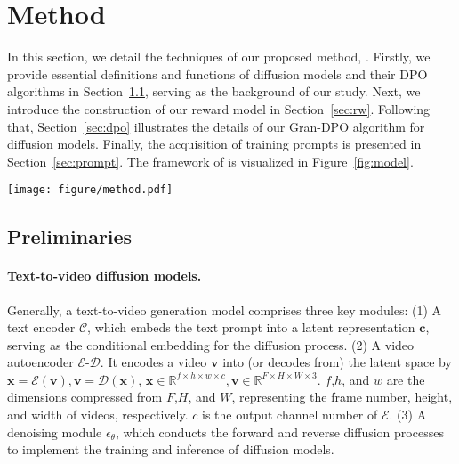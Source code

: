 \section{\ours{} Method}\label{sec:method}

In this section, we detail the techniques of our proposed method, \ours{}. 
Firstly, we provide essential definitions and functions of diffusion models and their DPO algorithms in Section~\ref{sec:preliminary}, serving as the background of our study.
Next, we introduce the construction of our reward model in Section~\ref{sec:rw}. 
Following that, Section~\ref{sec:dpo} illustrates the details of our Gran-DPO algorithm for diffusion models. Finally, the acquisition of training prompts is presented in Section~\ref{sec:prompt}. The framework of \ours{} is visualized in Figure~\ref{fig:model}.

\begin{figure*}[ht]
    \centering
    \texttt{[image: figure/method.pdf]}
    \caption{The framework of our proposed method, \ours{}.
    }
    \label{fig:model}
\end{figure*}

\subsection{Preliminaries}\label{sec:preliminary}

\paragraph{Text-to-video diffusion models.}
Generally, a text-to-video generation model comprises three key modules: (1) A text encoder $\mathcal{C}$, which embeds the text prompt into a latent representation $\mathbf{c}$, serving as the conditional embedding for the diffusion process. (2) A video autoencoder $\mathcal{E}$-$\mathcal{D}$. It encodes a video $\mathbf{v}$ into (or decodes from) the latent space by 
$\mathbf{x}=\mathcal{E}(\mathbf{v}), \mathbf{v}=\mathcal{D}(\mathbf{x})$, $\mathbf{x}\in\mathbb{R}^{f\times h\times w\times c},\mathbf{v}\in\mathbb{R}^{F\times H\times W\times 3}$. $f$,$h$, and $w$ are the dimensions compressed from $F$,$H$, and $W$, representing the frame number, height, and width of videos, respectively. $c$ is the output channel number of $\mathcal{E}$. 
(3) A denoising module $\epsilon_\theta$, which conducts the forward and reverse diffusion processes to implement the training and inference of diffusion models. 

